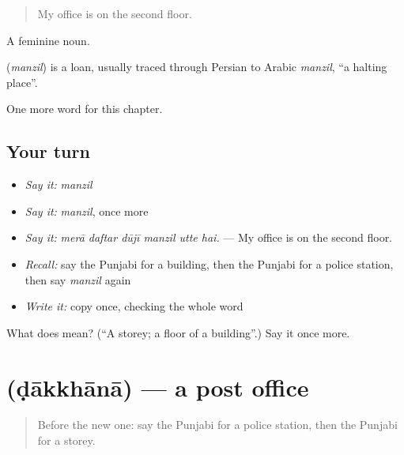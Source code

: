 \begin{quote}
My office is on the second floor.
\end{quote}

A feminine noun.

\begin{cousinweb}
\textbf{} (\emph{manzil}) is a loan, usually traced through Persian to Arabic \emph{manzil}, \textquotedblleft{}a halting place\textquotedblright{}.
\end{cousinweb}

\begin{grammarlens}[title={What you've built}]
One more word for this chapter.
\end{grammarlens}

\subsection*{Your turn}
\begin{itemize}
\raggedright
  \item \emph{Say it:} \emph{manzil}
  \item \emph{Say it:} \emph{manzil}, once more
  \item \emph{Say it:} \emph{merā daftar dūjī manzil utte hai.} — My office is on the second floor.
  \item \emph{Recall:} say the Punjabi for a building, then the Punjabi for a police station, then say \emph{manzil} again
  \item \emph{Write it:} copy \textbf{} once, checking the whole word
\end{itemize}

\begin{tcolorbox}[breakable,colback=teal!4,colframe=teal!35!black,title={Before you move on}]
What does  mean? (\textquotedblleft{}A storey; a floor of a building\textquotedblright{}.) Say it once more.
\end{tcolorbox}
\section[\texorpdfstring{\pa{ਡਾਕਖ਼ਾਨਾ} (ḍākkhānā)}{ਡਾਕਖ਼ਾਨਾ (ḍākkhānā)}]{ (ḍākkhānā) — a post office}

\label{lesson:PA-C267-dakkhana}



\begin{quote}
Before the new one: say the Punjabi for a police station, then the Punjabi for a storey.
\end{quote}

